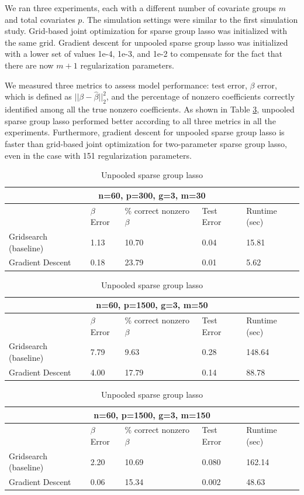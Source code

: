 \documentclass[10pt,letterpaper]{article}
\begin{document}
We ran three experiments, each with a different number of covariate groups $m$ and total covariates $p$. The simulation settings were similar to the first simulation study. Grid-based joint optimization for sparse group lasso was initialized with the same grid. Gradient descent for unpooled sparse group lasso was initialized with a lower set of values 1e-4, 1e-3, and 1e-2 to compensate for the fact that there are now $m + 1$ regularization parameters.

We measured three metrics to assess model performance: test error, $\beta$ error, which is defined as $\lvert \lvert \beta - \hat \beta \rvert \rvert_2 ^2$, and the percentage of nonzero coefficients correctly identified among all the true nonzero coefficients. As shown in Table \ref{table:unpooled}, unpooled sparse group lasso performed better according to all three metrics in all the experiments. Furthermore, gradient descent for unpooled sparse group lasso is faster than grid-based joint optimization for two-parameter sparse group lasso, even in the case with 151 regularization parameters.

\begin{table}
\begin{center}
\begin{tabular}{| l | l | l | l | l | }
\hline
\multicolumn{5}{|c|}{n=60, p=300, g=3, m=30}\\
\hline
 & $\beta$ Error & \% correct nonzero $\beta$ & Test Error & Runtime (sec) \\
\hline
Gridsearch (baseline) & 1.13 & 10.70 & 0.04 & 15.81 \\
\hline
Gradient Descent & 0.18 & 23.79 & 0.01 & 5.62 \\
\hline
\end{tabular}

\begin{tabular}{| l | l | l | l | l | }
\hline
\multicolumn{5}{|c|}{n=60, p=1500, g=3, m=50}\\
\hline
 & $\beta$ Error & \% correct nonzero $\beta$ & Test Error & Runtime (sec) \\
\hline
Gridsearch (baseline) & 7.79 & 9.63 & 0.28 & 148.64 \\
\hline
Gradient Descent & 4.00 & 17.79 & 0.14 & 88.78 \\
\hline
\end{tabular}

\begin{tabular}{| l | l | l | l | l | }
\hline
\multicolumn{5}{|c|}{n=60, p=1500, g=3, m=150}\\
\hline
 & $\beta$ Error & \% correct nonzero $\beta$ & Test Error & Runtime (sec) \\
\hline
Gridsearch (baseline) & 2.20 & 10.69 & 0.080 & 162.14 \\
\hline
Gradient Descent & 0.06 & 15.34 & 0.002 & 48.63 \\
\hline
\end{tabular}
\end{center}
\caption {Unpooled sparse group lasso}
\label{table:unpooled}
\end{table}
\end{document}
